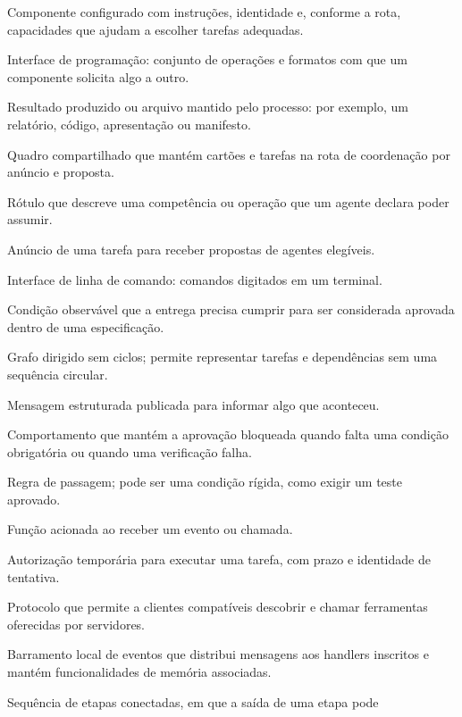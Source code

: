 \begin{resultado}
{\footnotesize
\begin{description}[leftmargin=3.2cm,style=nextline,itemsep=1pt]
\item[Agente] Componente configurado com instruções, identidade e, conforme a rota,
capacidades que ajudam a escolher tarefas adequadas.
\item[API] Interface de programação: conjunto de operações e formatos com que um
componente solicita algo a outro.
\item[Artefato] Resultado produzido ou arquivo mantido pelo processo: por exemplo,
um relatório, código, apresentação ou manifesto.
\item[Blackboard] Quadro compartilhado que mantém cartões e tarefas na rota de
coordenação por anúncio e proposta.
\item[Capacidade] Rótulo que descreve uma competência ou operação que um agente
declara poder assumir.
\item[CFP] Anúncio de uma tarefa para receber propostas de agentes elegíveis.
\item[CLI] Interface de linha de comando: comandos digitados em um terminal.
\item[Critério de aceitação] Condição observável que a entrega precisa cumprir para
ser considerada aprovada dentro de uma especificação.
\item[DAG] Grafo dirigido sem ciclos; permite representar tarefas e dependências
sem uma sequência circular.
\item[Evento] Mensagem estruturada publicada para informar algo que aconteceu.
\item[Fail-closed] Comportamento que mantém a aprovação bloqueada quando falta uma
condição obrigatória ou quando uma verificação falha.
\item[Gate] Regra de passagem; pode ser uma condição rígida, como exigir um teste
aprovado.
\item[Handler] Função acionada ao receber um evento ou chamada.
\item[Lease] Autorização temporária para executar uma tarefa, com prazo e identidade
de tentativa.
\item[MCP] Protocolo que permite a clientes compatíveis descobrir e chamar
ferramentas oferecidas por servidores.
\item[MetaBus] Barramento local de eventos que distribui mensagens aos handlers
inscritos e mantém funcionalidades de memória associadas.
\item[Pipeline] Sequência de etapas conectadas, em que a saída de uma etapa pode

\end{description}}
\end{resultado}
